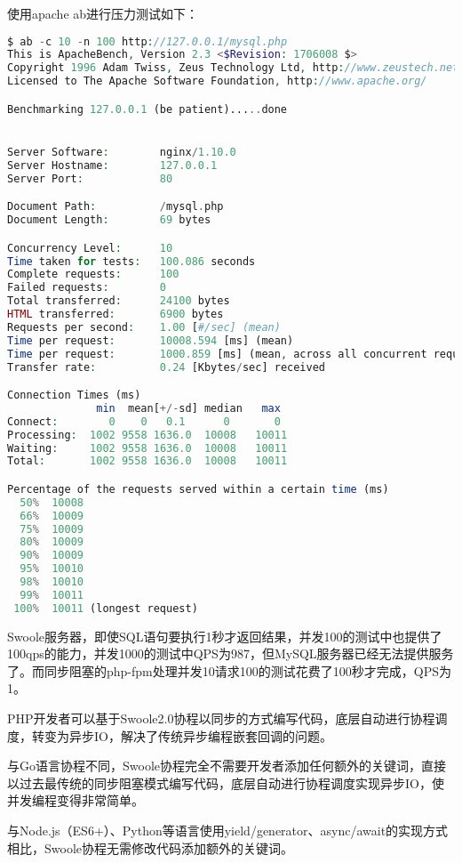 使用apache ab进行压力测试如下：


\begin{lstlisting}[language=PHP]
$ ab -c 10 -n 100 http://127.0.0.1/mysql.php
This is ApacheBench, Version 2.3 <$Revision: 1706008 $>
Copyright 1996 Adam Twiss, Zeus Technology Ltd, http://www.zeustech.net/
Licensed to The Apache Software Foundation, http://www.apache.org/

Benchmarking 127.0.0.1 (be patient).....done


Server Software:        nginx/1.10.0
Server Hostname:        127.0.0.1
Server Port:            80

Document Path:          /mysql.php
Document Length:        69 bytes

Concurrency Level:      10
Time taken for tests:   100.086 seconds
Complete requests:      100
Failed requests:        0
Total transferred:      24100 bytes
HTML transferred:       6900 bytes
Requests per second:    1.00 [#/sec] (mean)
Time per request:       10008.594 [ms] (mean)
Time per request:       1000.859 [ms] (mean, across all concurrent requests)
Transfer rate:          0.24 [Kbytes/sec] received

Connection Times (ms)
              min  mean[+/-sd] median   max
Connect:        0    0   0.1      0       0
Processing:  1002 9558 1636.0  10008   10011
Waiting:     1002 9558 1636.0  10008   10011
Total:       1002 9558 1636.0  10008   10011

Percentage of the requests served within a certain time (ms)
  50%  10008
  66%  10009
  75%  10009
  80%  10009
  90%  10009
  95%  10010
  98%  10010
  99%  10011
 100%  10011 (longest request)
\end{lstlisting}


Swoole服务器，即使SQL语句要执行1秒才返回结果，并发100的测试中也提供了100qps的能力，并发1000的测试中QPS为987，但MySQL服务器已经无法提供服务了。而同步阻塞的php-fpm处理并发10请求100的测试花费了100秒才完成，QPS为1。



PHP开发者可以基于Swoole2.0协程以同步的方式编写代码，底层自动进行协程调度，转变为异步IO，解决了传统异步编程嵌套回调的问题。

与Go语言协程不同，Swoole协程完全不需要开发者添加任何额外的关键词，直接以过去最传统的同步阻塞模式编写代码，底层自动进行协程调度实现异步IO，使并发编程变得非常简单。

与Node.js（ES6+）、Python等语言使用yield/generator、async/await的实现方式相比，Swoole协程无需修改代码添加额外的关键词。

